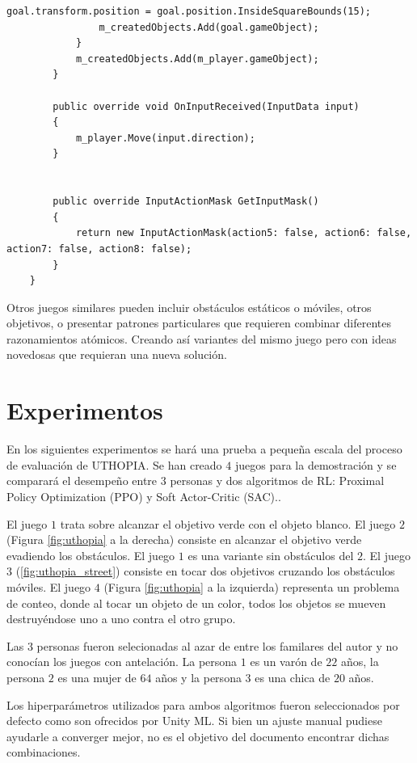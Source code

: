 \begin{lstlisting}[caption={Ejemplo de implementación de un juego que trata sobre un objeto de color blanco que debe tocar al objeto verde.}]
                goal.transform.position = goal.position.InsideSquareBounds(15);
                m_createdObjects.Add(goal.gameObject);
            }
            m_createdObjects.Add(m_player.gameObject);
        }
 
        public override void OnInputReceived(InputData input)
        {
            m_player.Move(input.direction);
        }
 
        
        public override InputActionMask GetInputMask()
        {
            return new InputActionMask(action5: false, action6: false, action7: false, action8: false);
        }
    }
\end{lstlisting}
 
Otros juegos similares pueden incluir obstáculos estáticos o móviles, otros objetivos, o presentar patrones particulares que requieren combinar diferentes razonamientos atómicos. Creando así variantes del mismo juego pero con ideas novedosas que requieran una nueva solución.

\section{Experimentos}
 
En los siguientes experimentos se hará una prueba a pequeña escala del proceso de evaluación de UTHOPIA. Se han creado $4$ juegos para la demostración y se comparará el desempeño entre $3$ personas y dos algoritmos de RL: Proximal Policy Optimization (PPO) y Soft Actor-Critic (SAC)..
 
El juego $1$ trata sobre alcanzar el objetivo verde con el objeto blanco. El juego $2$ (Figura \ref{fig:uthopia} a la derecha) consiste en alcanzar el objetivo verde evadiendo los obstáculos. El juego $1$ es una variante sin obstáculos del $2$. El juego $3$ (\ref{fig:uthopia_street}) consiste en tocar dos objetivos cruzando los obstáculos móviles. El juego $4$ (Figura \ref{fig:uthopia} a la izquierda) representa un problema de conteo, donde al tocar un objeto de un color, todos los objetos se mueven destruyéndose uno a uno contra el otro grupo.

Las $3$ personas fueron selecionadas al azar de entre los familares del autor y no conocían los juegos con antelación. La persona $1$ es un varón de $22$ años, la persona $2$ es una mujer de $64$ años y la persona $3$ es una chica de $20$ años. 

Los hiperparámetros utilizados para ambos algoritmos fueron seleccionados por defecto como son ofrecidos por Unity ML. Si bien un ajuste manual pudiese ayudarle a converger mejor, no es el objetivo del documento encontrar dichas combinaciones.
 
